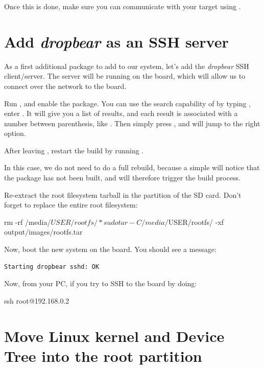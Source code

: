 Once this is done, make sure you can communicate with your target
using .

\section{Add {\em dropbear} as an SSH server}

As a first additional package to add to our system, let's add the {\em
  dropbear} SSH client/server. The server will be running on the
board, which will allow us to connect over the network to the board.

Run , and enable the 
package. You can use the search capability of  by
typing \code{/}, enter . It will give you a list of
results, and each result is associated with a number between
parenthesis, like . Then simply press , and
 will jump to the right option.

After leaving , restart the build by running
.

In this case, we do not need to do a full rebuild, because a simple
 will notice that the  package has not been
built, and will therefore trigger the build process.

Re-extract the root filesystem tarball in the  partition
of the SD card. Don't forget to replace the entire root filesystem:

\begin{bashinput}
rm -rf /media/$USER/rootfs/*
sudo tar -C /media/$USER/rootfs/ -xf output/images/rootfs.tar
\end{bashinput}

Now, boot the new system on the board. You should see a message:

\begin{verbatim}
Starting dropbear sshd: OK
\end{verbatim}

Now, from your PC, if you try to SSH to the board by doing:

\begin{bashinput}
ssh root@192.168.0.2
\end{bashinput}

\section{Move Linux kernel and Device Tree into the root partition}

